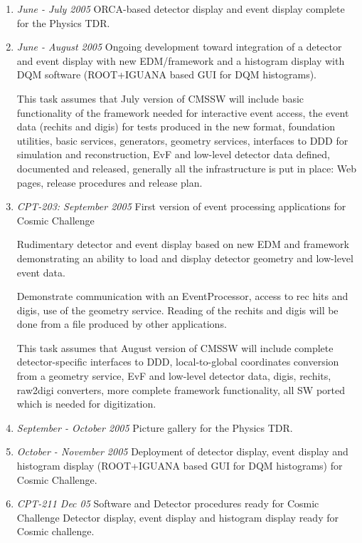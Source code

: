 \documentclass[draftmode]{memarticle}
\begin{document}
\begin{enumerate}
  \item {\em June - July 2005} ORCA-based detector display and event
  display complete for the Physics TDR.

  \item {\em June - August 2005} Ongoing development toward
  integration of a detector and event display with new EDM/framework
  and a histogram display with DQM software (ROOT+IGUANA based GUI for
  DQM histograms).

  This task assumes that July version of CMSSW will include basic
  functionality of the framework needed for interactive event access,
  the event data (rechits and digis) for tests produced in the new
  format, foundation utilities, basic services, generators, geometry
  services, interfaces to DDD for simulation and reconstruction, EvF
  and low-level detector data defined, documented and released,
  generally all the infrastructure is put in place: Web pages, release
  procedures and release plan.

  \item {\em CPT-203: September 2005} First version of event
  processing applications for Cosmic Challenge

  Rudimentary detector and event display based on new EDM and
  framework demonstrating an ability to load and display detector
  geometry and low-level event data.

  Demonstrate communication with an EventProcessor, access to rec hits
  and digis, use of the geometry service. Reading of the rechits and
  digis will be done from a file produced by other applications.

  This task assumes that August version of CMSSW will include complete
  detector-specific interfaces to DDD, local-to-global coordinates
  conversion from a geometry service, EvF and low-level detector data,
  digis, rechits, raw2digi converters, more complete framework
  functionality, all SW ported which is needed for digitization.

  \item {\em September - October 2005} Picture gallery for the Physics
  TDR.

  \item {\em October - November 2005} Deployment of detector display,
  event display and histogram display (ROOT+IGUANA based GUI for DQM
  histograms) for Cosmic Challenge.

  \item {\em CPT-211 Dec 05} Software and Detector procedures ready
  for Cosmic Challenge
  Detector display, event display and histogram display ready for
  Cosmic challenge.


\end{enumerate}
\end{document}
